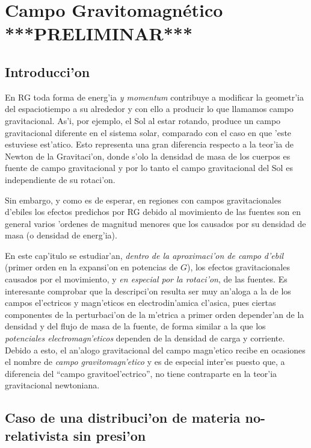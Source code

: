\chapter{Campo Gravitomagn\'etico ***PRELIMINAR***}\label{cap:gravito}

\section{Introducci'on}

En RG toda forma de energ'ia \textit{y momentum} contribuye a modificar la geometr'ia del espaciotiempo a su alrededor y con ello a producir lo que llamamos campo gravitacional. As'i, por ejemplo, el Sol al estar rotando, produce un campo gravitacional diferente en el sistema solar, comparado con el caso en que 'este estuviese est'atico. Esto representa una gran diferencia respecto a la teor'ia de Newton de la Gravitaci'on, donde s'olo la densidad de masa de los cuerpos es fuente de campo gravitacional y por lo tanto el campo gravitacional del Sol es independiente de su rotaci'on.

Sin embargo, y como es de esperar, en regiones con campos gravitacionales d'ebiles los efectos predichos por RG debido al movimiento de las fuentes son en general varios 'ordenes de magnitud menores que los causados por su densidad de masa (o densidad de energ'ia).

En este cap'itulo se estudiar'an, \textit{dentro de la aproximaci'on de campo d'ebil} (primer orden en la expansi'on en potencias de $G$), los efectos gravitacionales causados por el movimiento, y \textit{en especial por la rotaci'on}, de las fuentes. Es interesante comprobar que la descripci'on resulta ser muy an'aloga a la de los campos el'ectricos y magn'eticos en electrodin'amica cl'asica, pues ciertas componentes de la perturbaci'on de la m'etrica a primer orden depender'an de la densidad y del flujo de masa de la fuente, de forma similar a la que los \textit{potenciales electromagn'eticos} dependen de la densidad de carga y corriente. Debido a esto, el an'alogo gravitacional del campo magn'etico recibe en ocasiones el nombre de \textit{campo gravitomagn'etico} y es de especial inter'es puesto que, a diferencia del ``campo gravitoel'ectrico'', no tiene contraparte en la teor'ia gravitacional newtoniana.


\section{Caso de una distribuci'on de materia no-relativista sin presi'on}\label{sec:CDNR}


